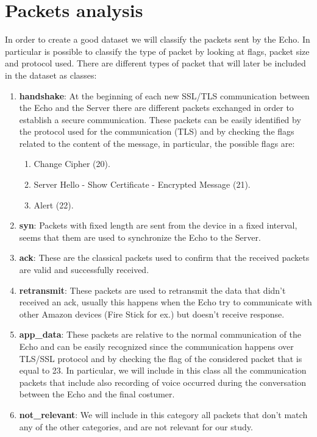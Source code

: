 \documentclass[sigconf]{acmart}
\begin{document}
    \section{Packets analysis}
    In order to create a good dataset we will classify the packets sent by the Echo.
    In particular is possible to classify the type of packet by looking at flags, packet size and protocol used.
    There are different types of packet that will later be included in the dataset as classes:
    \begin{enumerate}
        \item \textbf{handshake}: At the beginning of each new SSL/TLS communication between the Echo and the Server there are different packets exchanged in order to establish a secure communication.
        These packets can be easily identified by the protocol used for the communication (TLS) and by checking the flags related to the content of the message, in particular, the possible flags are:
        \begin{enumerate}
            \item Change Cipher (20).
            \item Server Hello - Show Certificate - Encrypted Message (21).
            \item Alert (22).
        \end{enumerate}
        \item \textbf{syn}: Packets with fixed length are sent from the device in a fixed interval, seems that them are used to synchronize the Echo to the Server.
        \item \textbf{ack}: These are the classical packets used to confirm that the received packets are valid and successfully received.
        \item \textbf{retransmit}: These packets are used to retransmit the data that didn't received an ack, usually this happens when the Echo try to communicate with other Amazon devices (Fire Stick for ex.) but doesn't receive response.
        \item \textbf{app\_data}: These packets are relative to the normal communication of the Echo and can be easily recognized since the communication happens over TLS/SSL protocol and by checking the flag of the considered packet that is equal to 23.
        In particular, we will include in this class all the communication packets that include also recording of voice occurred during the conversation between the Echo and the final costumer.
        \item \textbf{not\_relevant}: We will include in this category all packets that don't match any of the other categories, and are not relevant for our study.
    \end{enumerate}
\end{document}
